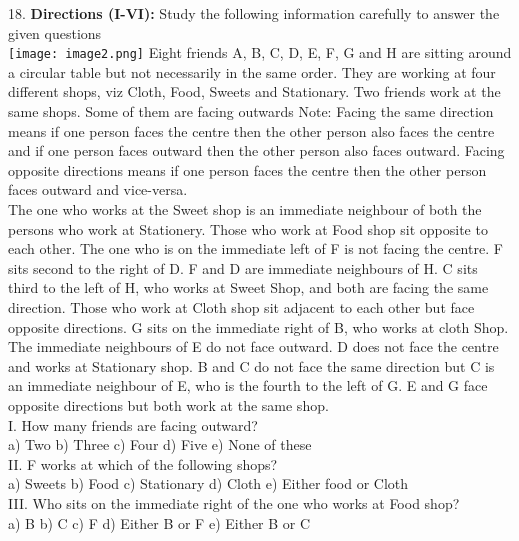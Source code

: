 \documentclass[
]{article}
\begin{document}
18. \textbf{Directions (I-VI):} Study the following information carefully to answer the given questions\\
\texttt{[image: image2.png]}
Eight friends A, B, C, D, E, F, G and H are sitting around a circular table but not necessarily
in the same order. They are working at four different shops, viz Cloth, Food, Sweets and
Stationary. Two friends work at the same shops. Some of them are facing outwards
Note: Facing the same direction means if one person faces the centre then the other person
also faces the centre and if one person faces outward then the other person also faces
outward. Facing opposite directions means if one person faces the centre then the other
person faces outward and vice-versa.\\
The one who works at the Sweet shop is an immediate neighbour of both the persons who
work at Stationery. Those who work at Food shop sit opposite to each other. The one who is
on the immediate left of F is not facing the centre. F sits second to the right of D. F and D are
immediate neighbours of H. C sits third to the left of H, who works at Sweet Shop, and both
are facing the same direction. Those who work at Cloth shop sit adjacent to each other but
face opposite directions. G sits on the immediate right of B, who works at cloth Shop. The
immediate neighbours of E do not face outward. D does not face the centre and works at
Stationary shop. B and C do not face the same direction but C is an immediate neighbour of
E, who is the fourth to the left of G. E and G face opposite directions but both work at the
same shop.\\
I. How many friends are facing outward?\\
a) Two \hspace{2mm}b) Three \hspace{2mm}c) Four \hspace{2mm}d) Five \hspace{2mm}e) None of these\\

II. F works at which of the following shops?\\
a) Sweets \hspace{2mm}b) Food \hspace{2mm}c) Stationary \hspace{2mm}d) Cloth \hspace{2mm}e) Either food or Cloth\\

III. Who sits on the immediate right of the one who works at Food shop?\\
a) B \hspace{2mm}b) C \hspace{2mm}c) F
\hspace{2mm}d) Either B or F \hspace{2mm}e) Either B or C\\
\end{document}
